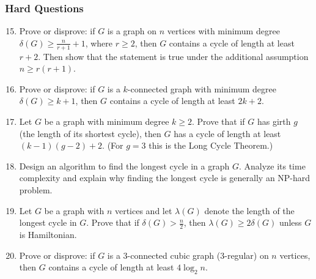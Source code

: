 \documentclass{article}
\theoremstyle{definition}
\begin{document}
\subsubsection{Hard Questions}
\begin{enumerate}\setcounter{enumi}{14}
\item Prove or disprove: if $G$ is a graph on $n$ vertices with minimum degree $\delta(G) \geq \frac{n}{r+1} + 1$, where $r \geq 2$, then $G$ contains a cycle of length at least $r+2$. Then show that the statement is true under the additional assumption $n \geq r(r+1)$.

\item Prove or disprove: if $G$ is a $k$-connected graph with minimum degree $\delta(G) \geq k+1$, then $G$ contains a cycle of length at least $2k+2$.

\item Let $G$ be a graph with minimum degree $k \geq 2$. Prove that if $G$ has girth $g$ (the length of its shortest cycle), then $G$ has a cycle of length at least $(k-1)(g-2)+2$. (For $g = 3$ this is the Long Cycle Theorem.)

\item Design an algorithm to find the longest cycle in a graph $G$. Analyze its time complexity and explain why finding the longest cycle is generally an NP-hard problem.

\item Let $G$ be a graph with $n$ vertices and let $\lambda(G)$ denote the length of the longest cycle in $G$. Prove that if $\delta(G) > \frac{n}{2}$, then $\lambda(G) \geq 2\delta(G)$ unless $G$ is Hamiltonian.

\item Prove or disprove: if $G$ is a 3-connected cubic graph (3-regular) on $n$ vertices, then $G$ contains a cycle of length at least $4\log_2 n$.
\end{enumerate}
\end{document}
